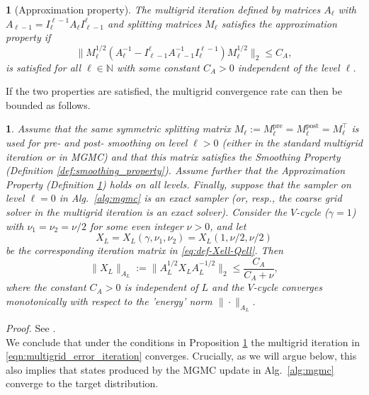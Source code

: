 \documentclass[11pt,english]{article}
\theoremstyle{plain}
\theoremstyle{plain}
\newtheorem{definition}[thm]{\protect\definitionname}
\newtheorem{prop}[thm]{\protect\propositionname}
\theoremstyle{plain}
\theoremstyle{plain}
\numberwithin{equation}{section}
\newcommand{\rev}[1]{#1}
\providecommand{\definitionname}{Definition}
\providecommand{\propositionname}{Proposition}
\begin{document}
\begin{definition}[Approximation property]\label{def:approximation_property}
	The multigrid iteration defined by matrices $A_{\ell}$ with $A_{\ell-1}=I_{\ell}^{\ell-1}A_{\ell} I_{\ell-1}^{\ell}$ and splitting matrices $M_\ell$ satisfies the approximation property if
	\begin{equation}
		\|M_{\ell}^{1/2}(A_{\ell}^{-1}-I_{\ell-1}^{\ell}A_{\ell-1}^{-1}I_{\ell}^{\ell-1})M_{\ell}^{1/2}\|_{2}\leq C_{A},\label{eq:V-important-cond}
	\end{equation}
	is satisfied for all \rev{$\ell\in\mathbb{N}$} with some constant $C_{A}>0$ independent of the level $\ell$.
\end{definition}
If the two properties are satisfied, the multigrid convergence rate can then be bounded as follows.
\begin{prop}\label{prop:V-cycle-bound}
	Assume that the same symmetric splitting matrix $M_\ell := M_\ell^{\mathrm{pre}} = M_\ell^{\mathrm{post}} = M_\ell^\top$ is used for pre- and post- smoothing on level $\ell>0$ (either in the standard multigrid iteration or in MGMC) and that this matrix satisfies the Smoothing Property (Definition \ref{def:smoothing_property}). Assume further that the Approximation Property (Definition \ref{def:approximation_property}) holds on all levels.  Finally, suppose that the sampler on level $\ell=0$ in Alg.~\ref{alg:mgmc} is an exact sampler (or, resp., the coarse grid solver in the multigrid iteration is an exact solver). Consider the $V$-cycle ($\gamma=1$)
	with $\nu_{1}=\nu_{2}=\nu/2$ for some even integer $\nu>0$, and
	let
	\[
		X_{L}=X_{L}(\gamma,\nu_{1},\nu_{2})=X_{L}(1,\nu/2,\nu/2)
	\]
	be the corresponding iteration matrix in \eqref{eq:def-Xell-Qell}.
	Then
	\begin{equation}
		\|X_{L}\|_{A_{L}}:=\|A_{L}^{1/2}X_{L}A_{L}^{-1/2}\|_{2}\leq\frac{C_{A}}{C_{A}+\nu},
		\label{eqn:energy_norm}
	\end{equation}
	where the constant $C_{A}>0$ is independent of $L$ and the $V$-cycle converges monotonically with respect to the 'energy' norm $\|\cdot\|_{A_{L}}$.
\end{prop}
\noindent\textit{Proof.} See \cite[Theorem 11.59]{Hackbusch.W_2016_IterativeSolutionLarge}.\\[1ex]
\noindent
We conclude that under the conditions in Proposition \ref{prop:V-cycle-bound} the multigrid iteration in \eqref{eqn:multigrid_error_iteration} converges. Crucially, as we will argue below, this also implies that states produced by the MGMC update in Alg.~\ref{alg:mgmc} converge to the target distribution.
\end{document}
